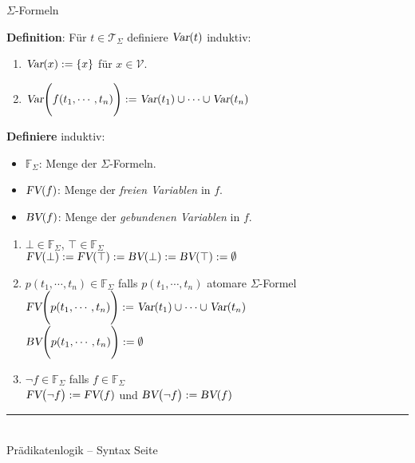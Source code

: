 \documentclass{slides}
\newcommand{\myrule}{\rule{20cm}{1mm}\\ }
\newcommand{\verum}{\top}
\newcommand{\falsum}{\bot}
\newcommand{\var}{\textsl{Var}}
\newcommand{\FV}{\textsl{FV}}
\newcommand{\BV}{\textsl{BV}}
\newcounter{mypage}
\begin{document}
\begin{slide}{}
\normalsize
\begin{center}
$\Sigma$-Formeln
\end{center}
\vspace{0.5cm}

\footnotesize
\textbf{Definition}: 
F\"{u}r  $t \in \mathcal{T}_\Sigma$ definiere $\var(t)$ induktiv:
\begin{enumerate}
\item $\var(x) := \{ x \}$ \quad f\"{u}r $x \in \mathcal{V}$.
\item $\var\Bigg( f(t_1,\cdots,t_n) \Bigg) := \var(t_1) \cup \cdots \cup \var(t_n)$ 
\end{enumerate}

\textbf{Definiere} induktiv:
\begin{itemize}
\item $\mathbb{F}_\Sigma$: Menge der $\Sigma$-Formeln.
\item $\FV(f)$: Menge der \emph{freien Variablen} in $f$.
\item $\BV(f)$:            Menge der \emph{gebundenen Variablen} in $f$.
\end{itemize}
\begin{enumerate}
\item  $\falsum \in \mathbb{F}_\Sigma$, $\verum \in \mathbb{F}_\Sigma$  \\[0.1cm]
       $\FV(\falsum) := \FV(\verum) := \BV(\falsum) := \BV(\verum) := \emptyset$
\item $p(t_1,\cdots,t_n) \in \mathbb{F}_\Sigma$ falls $p(t_1,\cdots,t_n)$   atomare $\Sigma$-Formel  \\[0.3cm]
      $\FV\Bigg(p(t_1,\cdots,t_n) \Bigg) := \var(t_1) \cup \cdots \cup \var(t_n)$ \\
      $\BV\Bigg(p(t_1,\cdots,t_n) \Bigg) := \emptyset$
\item $\neg f \in \mathbb{F}_\Sigma$ falls $f \in \mathbb{F}_\Sigma$ \\[0.3cm]
      $\FV\bigl( \neg f \bigr) := \FV(f)$ \quad und \quad $\BV\bigl( \neg f \bigr) := \BV(f)$
\end{enumerate}


\vspace*{\fill}
\tiny \addtocounter{mypage}{1}
\myrule
Pr\"{a}dikatenlogik -- Syntax  \hspace*{\fill} Seite 
\end{slide}

\end{document}
